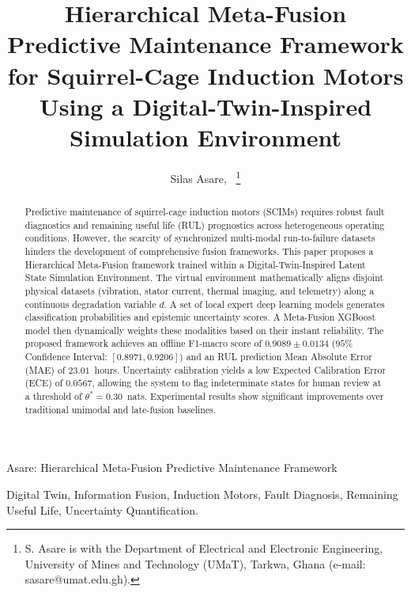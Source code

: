 \documentclass[journal]{IEEEtran}
\begin{document}
\title{Hierarchical Meta-Fusion Predictive Maintenance Framework for Squirrel-Cage Induction Motors Using a Digital-Twin-Inspired Simulation Environment}

\author{Silas Asare,~
\thanks{S. Asare is with the Department of Electrical and Electronic Engineering, University of Mines and Technology (UMaT), Tarkwa, Ghana (e-mail: sasare@umat.edu.gh).}}

%
{Asare: Hierarchical Meta-Fusion Predictive Maintenance Framework}

\maketitle

\begin{abstract}
Predictive maintenance of squirrel-cage induction motors (SCIMs) requires robust fault diagnostics and remaining useful life (RUL) prognostics across heterogeneous operating conditions. However, the scarcity of synchronized multi-modal run-to-failure datasets hinders the development of comprehensive fusion frameworks. This paper proposes a Hierarchical Meta-Fusion framework trained within a Digital-Twin-Inspired Latent State Simulation Environment. The virtual environment mathematically aligns disjoint physical datasets (vibration, stator current, thermal imaging, and telemetry) along a continuous degradation variable $d$. A set of local expert deep learning models generates classification probabilities and epistemic uncertainty scores. A Meta-Fusion XGBoost model then dynamically weights these modalities based on their instant reliability. The proposed framework achieves an offline F1-macro score of $0.9089 \pm 0.0134$ ($95\%$ Confidence Interval: $[0.8971, 0.9206]$) and an RUL prediction Mean Absolute Error (MAE) of $23.01$~hours. Uncertainty calibration yields a low Expected Calibration Error (ECE) of $0.0567$, allowing the system to flag indeterminate states for human review at a threshold of $\theta^* = 0.30$~nats. Experimental results show significant improvements over traditional unimodal and late-fusion baselines.
\end{abstract}

\begin{IEEEkeywords}
Digital Twin, Information Fusion, Induction Motors, Fault Diagnosis, Remaining Useful Life, Uncertainty Quantification.
\end{IEEEkeywords}
\end{document}
